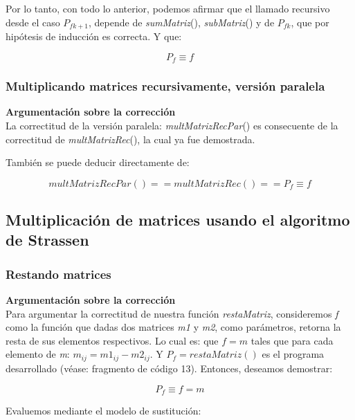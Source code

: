 \documentclass{article}
\begin{document}
Por lo tanto, con todo lo anterior, podemos afirmar que el llamado recursivo desde el caso \(P_{fk+1}\), depende de \textit{sumMatriz}(), \textit{subMatriz}() y de \(P_{fk}\), que por hipótesis de inducción es correcta. Y que:

\begin{equation*}
    P_f \equiv f
\end{equation*}

\subsubsection{Multiplicando matrices recursivamente, versión paralela}

\textbf{Argumentación sobre la corrección}\\

La correctitud de la versión paralela: \textit{multMatrizRecPar}() es consecuente de la correctitud de \textit{multMatrizRec}(), la cual ya fue demostrada.

También se puede deducir directamente de:

\begin{equation*}
    multMatrizRecPar() == multMatrizRec() == P_f \equiv f
\end{equation*}

\subsection{Multiplicación de matrices usando el algoritmo de Strassen}
\subsubsection{Restando matrices}

\textbf{Argumentación sobre la corrección}\\

Para argumentar la correctitud de nuestra función \textit{restaMatriz}, consideremos \textit{f} como la función que dadas dos matrices \textit{m1} y \textit{m2}, como parámetros, retorna la resta de sus elementos respectivos. Lo cual es: que \(f = m\) tales que para cada elemento de \textit{m}: \(m_{ij} = m1_{ij} - m2_{ij}\). Y \(P_f = restaMatriz()\) es el programa desarrollado (véase: fragmento de código 13). Entonces, deseamos demostrar: 

\begin{equation*}
    P_f \equiv f = m
\end{equation*}

Evaluemos mediante el modelo de sustitución:
\end{document}
